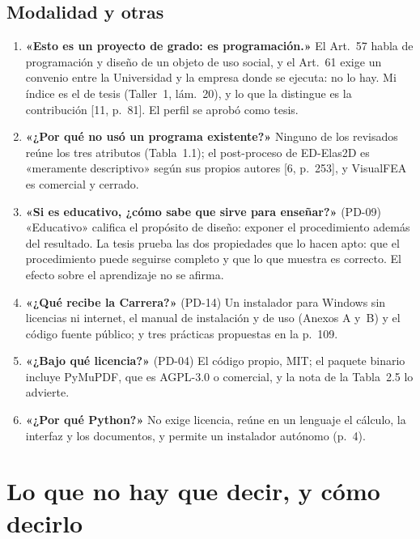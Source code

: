\documentclass[11pt,a4paper]{article}
\begin{document}
\subsection{Modalidad y otras}
\begin{enumerate}[resume*=preg]
\item \textbf{«Esto es un proyecto de grado: es programación.»} El Art.~57 habla de programación y diseño de un objeto de uso social, y el Art.~61 exige un convenio entre la Universidad y la empresa donde se ejecuta: no lo hay. Mi índice es el de tesis (Taller~1, lám.~20), y lo que la distingue es la contribución [11, p.~81]. El perfil se aprobó como tesis.
\item \textbf{«¿Por qué no usó un programa existente?»} Ninguno de los revisados reúne los tres atributos (Tabla~1.1); el post-proceso de ED-Elas2D es «meramente descriptivo» según sus propios autores [6, p.~253], y VisualFEA es comercial y cerrado.
\item \textbf{«Si es educativo, ¿cómo sabe que sirve para enseñar?»} (PD-09) «Educativo» califica el propósito de diseño: exponer el procedimiento además del resultado. La tesis prueba las dos propiedades que lo hacen apto: que el procedimiento puede seguirse completo y que lo que muestra es correcto. El efecto sobre el aprendizaje no se afirma.
\item \textbf{«¿Qué recibe la Carrera?»} (PD-14) Un instalador para Windows sin licencias ni internet, el manual de instalación y de uso (Anexos A y~B) y el código fuente público; y tres prácticas propuestas en la p.~109.
\item \textbf{«¿Bajo qué licencia?»} (PD-04) El código propio, MIT; el paquete binario incluye PyMuPDF, que es AGPL-3.0 o comercial, y la nota de la Tabla~2.5 lo advierte.
\item \textbf{«¿Por qué Python?»} No exige licencia, reúne en un lenguaje el cálculo, la interfaz y los documentos, y permite un instalador autónomo (p.~4).
\end{enumerate}

\section{Lo que no hay que decir, y cómo decirlo}\label{sec:no-decir}
\end{document}
